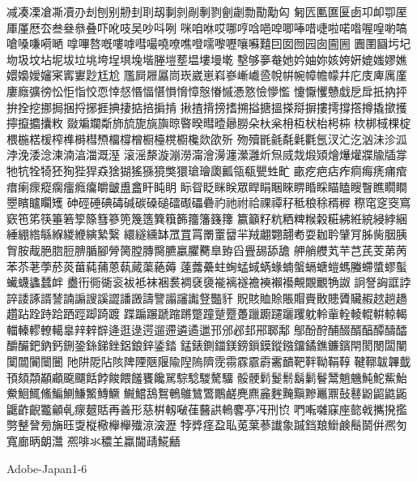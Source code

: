减凑凓凔凘凟刅刦刨别刱刲刵刼剚剠剮剸剹劊劌勡勩勱匃
匑匟匭匲匽卥卭卹卾厔厙厪厯厺叁叄叅叠吓吪吱吴吵呌咧
咪咱咻哎哪哼唅唈唕唧唪唶啑啦喏喒喔喤喲嗃嗆嗓嗛嗬嗮
嗱嗶嗸嘅嘍嘑嘒嘬嘵嘹噍噔嚅嚟嚦嚷囌囏囙囡囫园囱圇圌
圚圛圝圬圮圽圾坟坫坭坺垃垗垮埕埧堍堦塍塏塟塭塿墁墘
墼够夣奙她妗妯妳姟姱姸媲媸嫪嫶嬛嬝嬡嬸宷寗寠尟尪尬
尶屙屜屭峝崁崴崽嵙嵾嶃巇巹帨帲帵幛幨幪幷庀庋庳庽廑
廔廕彍徬忪怇恉恔恧悻惄惽愊愖愪愶慞慤慻慽慿憝憸懜懢
懥懨戄戇戱戹戽扺抐抨拚拴挖挪挶捆捋捓捱捵捿掂掊掮掯
揪揸揹搒搘搠搤搪搵搽搿摒摟摴撐撘撙撬撳擭擰攛攟攮敉
敠斒斕斴斾旈旎旐旟晾暋暌暳曀曏朥朵杕枀枏枑枤枱枵枾
栨梆棫棵椗椳椸楛楥榨榫榯槥槱橊橕橧橱檯櫈櫉欃欻欿歽
歾殰毷毹氄氉氍氬汊汒汔汹沬沴泒浡浼涹淰湅湳湻湽溉溼
滚滛漦漩漰澇澝澮澷瀍瀠灉炘炰烕烖煅熲燴爗爟牃牏牐牚
牠牨牷犄狉狥狴猂猋猞猢猺猻獍獘獧瑲璯瓟瓤瓴瓻甖甡甿
畞疙疤痁痄痌痗痜痡痯瘄瘌瘝瘲瘸癅癊癟皭皽盙盫盰盹眀
眎眢眨眯眹眾睅睊睏睞睤睧睬瞄瞌瞍瞖瞧瞯瞷瞾矉矑矙矱
砷硜硾碘碡碱碳磉磓礌礟礧礨礿祂祔祫祼禫秄秪稂稌稰稺
穄窀窆窔窵窽竾笫筷箠箬箰篨篲篸篼篾簉簨簯籂籒籓籛籜
籝籲籽粇粞粺糇糓糚紼絍綂綅綍綑綞綳綹緐緥緵緶縯縶繄
繯繸纁缽罛罝罥罱罿羀羋羢翽翾翿耇耍耞耹肈肎胏胔胭胰
胷胺胾脃脗脰腗腯腳膋膐膛膞臋臕臝臞臡臯臶舀舋舓舔舚
舺艄艭芄芉芑芪芰苐苪苯苶荖荸菸菼葘蒓蒱蒽蓻蕆蕖蕝薅
薘虂虆蛀蜔蜢蜮蜹蝝蝻螌螎螗螘螞螣螮螿蟉蟚蠘蠛蠭蠺衅
衋衎衕衚衮袚袛袜裍裠裯褎褏褦褵襚襜襫襰襼覥覵覼觕詉
詗詧詾誆誖誶諉諑諝諬諵謆謏謑譅譒譭譸譼譾讅讟豋豓豻
貺賅賉賒賬賵賷贁贃贗贜赮趑趟趫趲跕跧跱跲跴踁踋踦踱
蹀蹁蹍蹏蹜蹡蹩蹱蹵蹷躉躐躕躚躧躩躭軨軰輇輘輥輧輬輵
輺轃轇轑轕辠辡辢辥逄逛逯遌遛遰遴遹邋邘邠邲邽郉郰鄅
鄥酚酧酺醊醑醕醰醻醽釂釅鈀鈉鈣鉶銎銯銻銼鋁鋃鋅鋈錔
錳錶鍘鍿鎂鎊鎻鏌鏦鏹鐂鐍鐎鐮鑌閈閡閿闆闉闑闒闠闤闦
阤阱阸阽陔陴陻陿隁隃隉隖隮霃霛霡霢霨霱靧靶靽靿鞙鞟
鞬鞹韍韠韯頇頦頮顢顣颴飅餂餑餕餵饈饔饞駡騌騐騣驁驑
骽骾鬁鬉鬋鬍鬎鬙鬵魈魕魨鮀鮆鮐鮝鮰鮿鯈鯿鰂鰜鰵鱄鱖
鱡鱨鴰鴽鵪鵻鷥鷩鷳鹺麂麃麄麰黤黰黲鼉鼏鼔鼛鼢鼦鼪鼫
鼴齚齯龞龥𠃵𤸄𤿲𧵳再善形慈栟軔㗞龿鿀鿁鿂𪊲𠅘𠖱𠛬𫝓
𠵘𫝚𫝜𥧌𫝶㦤㦸𢹂𫝼㩜𠟈𢿫𧦴㫄㫋𫞂㪅𫞋㯳櫸𣟱𫞔鿌㴱𤁋
㹀㢡𫞬𫞯𫟉𫟏𫟒𦲞䜟𧰼䠞𫟰𫝥𫠍𫠗鬝鬬倂凞匇寬廊昞朗灊
凞啡氺穠𦍌蠃閫靕𩸽𪘚

Adobe-Japan1-6

